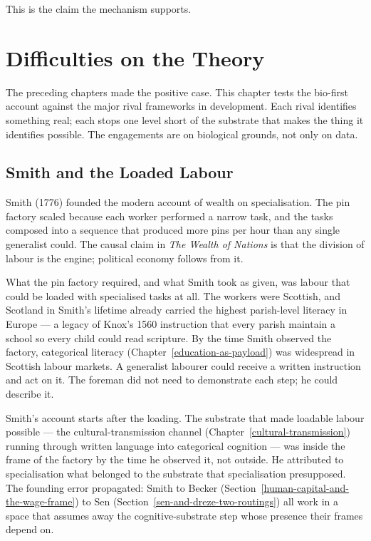 \documentclass[12pt,letterpaper]{article}
\begin{document}
This is the claim the mechanism supports.

\section{Difficulties on the Theory}\label{difficulties-on-the-theory}

{\renewcommand{\thetable}{A\arabic{table}}%
\setcounter{table}{4}


The preceding chapters made the positive case. This chapter tests the bio-first account against the major rival frameworks in development. Each rival identifies something real; each stops one level short of the substrate that makes the thing it identifies possible. The engagements are on biological grounds, not only on data.

\subsection{Smith and the Loaded Labour}\label{smith-and-the-loaded-labour}

Smith (1776) founded the modern account of wealth on specialisation. The pin factory scaled because each worker performed a narrow task, and the tasks composed into a sequence that produced more pins per hour than any single generalist could. The causal claim in \emph{The Wealth of Nations} is that the division of labour is the engine; political economy follows from it.

What the pin factory required, and what Smith took as given, was labour that could be loaded with specialised tasks at all. The workers were Scottish, and Scotland in Smith's lifetime already carried the highest parish-level literacy in Europe --- a legacy of Knox's 1560 instruction that every parish maintain a school so every child could read scripture. By the time Smith observed the factory, categorical literacy (Chapter~\ref{education-as-payload}) was widespread in Scottish labour markets. A generalist labourer could receive a written instruction and act on it. The foreman did not need to demonstrate each step; he could describe it.

Smith's account starts after the loading. The substrate that made loadable labour possible --- the cultural-transmission channel (Chapter~\ref{cultural-transmission}) running through written language into categorical cognition --- was inside the frame of the factory by the time he observed it, not outside. He attributed to specialisation what belonged to the substrate that specialisation presupposed. The founding error propagated: Smith to Becker (Section~\ref{human-capital-and-the-wage-frame}) to Sen (Section~\ref{sen-and-dreze-two-routings}) all work in a space that assumes away the cognitive-substrate step whose presence their frames depend on.

}
\end{document}
